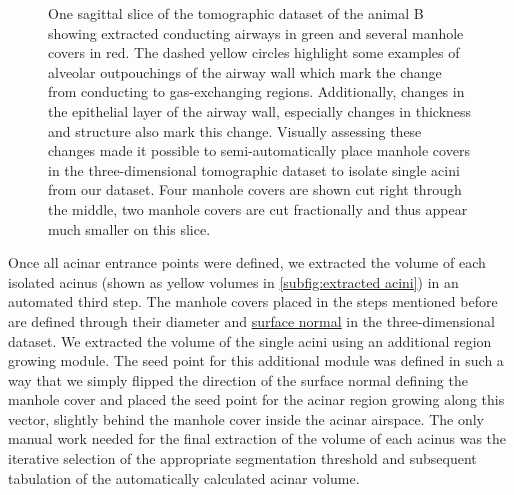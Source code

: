 \documentclass[twoside,paper=a4,abstract=true,english,DIV=calc]{scrartcl}
\newlength\imagescale		%
\begin{document}
\begin{figure}
%
	\caption{One sagittal slice of the tomographic dataset of the animal B showing extracted conducting airways in green and several manhole covers in red. The dashed yellow circles highlight some examples of alveolar outpouchings of the airway wall which mark the change from conducting to gas-exchanging regions. Additionally, changes in the epithelial layer of the airway wall, especially changes in thickness and structure also mark this change. Visually assessing these changes made it possible to semi-automatically place manhole covers in the three-dimensional tomographic dataset to isolate single acini from our dataset. Four manhole covers are shown cut right through the middle, two manhole covers are cut fractionally and thus appear much smaller on this slice.}
	\label{fig:ManholeCoverExplanation}
\end{figure}

Once all acinar entrance points were defined, we extracted the volume of each isolated acinus (shown as yellow volumes in \autoref{subfig:extracted acini}) in an automated third step. The manhole covers placed in the steps mentioned before are defined through their diameter and \href{https://secure.wikimedia.org/wikipedia/en/w/index.php?title=Surface_normal&oldid=411684319}{surface normal} in the three-dimensional dataset. We extracted the volume of the single acini using an additional region growing module. The seed point for this additional module was defined in such a way that we simply flipped the direction of the surface normal defining the manhole cover and placed the seed point for the acinar region growing along this vector, slightly behind the manhole cover inside the acinar airspace. The only manual work needed for the final extraction of the volume of each acinus was the iterative selection of the appropriate segmentation threshold and subsequent tabulation of the automatically calculated acinar volume.
\end{document}
